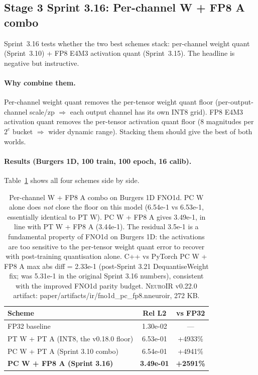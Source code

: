 \documentclass[10pt,twocolumn]{article}
\renewcommand{\texttt}[1]{{\normalfont\ttfamily #1}\normalfont\rmfamily}
\newcommand{\neuroir}{\textsc{NeuroIR}}
\begin{document}
\subsection{Stage 3 Sprint 3.16: Per-channel W + FP8 A combo}
\label{sec:pc-fp8-combo}

Sprint~3.16 tests whether the two best schemes
stack: per-channel weight quant (Sprint~3.10) +
FP8 E4M3 activation quant (Sprint~3.15).  The
headline is negative but instructive.

\paragraph{Why combine them.}
Per-channel weight quant removes the per-tensor
weight quant floor (per-output-channel scale/zp
$\Rightarrow$ each output channel has its own INT8
grid).  FP8 E4M3 activation quant removes the
per-tensor activation quant floor (8 magnitudes
per $2^e$ bucket $\Rightarrow$ wider dynamic range).
Stacking them should give the best of both
worlds.

\paragraph{Results (Burgers 1D, 100 train, 100 epoch, 16 calib).}
Table~\ref{tab:pc-fp8-combo} shows all four
schemes side by side.

\begin{table}[h]
\centering
\begin{tabular}{lcc}
\hline
\textbf{Scheme} & \textbf{Rel L2} & \textbf{vs FP32} \\
\hline
FP32 baseline & 1.30e-02 & --- \\
PT W + PT A (INT8, the v0.18.0 floor) & 6.53e-01 & +4933\% \\
PC W + PT A (Sprint 3.10 combo) & 6.54e-01 & +4941\% \\
\textbf{PC W + FP8 A (Sprint 3.16)} & \textbf{3.49e-01} & \textbf{+2591\%} \\
\hline
\end{tabular}
\caption{Per-channel W + FP8 A combo on Burgers 1D
FNO1d.  PC W alone does \emph{not} close the floor
on this model (6.54e-1 vs 6.53e-1, essentially
identical to PT W).  PC W + FP8 A gives 3.49e-1,
in line with PT W + FP8 A (3.44e-1).  The
residual 3.5e-1 is a fundamental property of
FNO1d on Burgers 1D: the activations are too
sensitive to the per-tensor weight quant error
to recover with post-training quantisation
alone.  C++ vs PyTorch PC W + FP8 A max abs
diff = 2.33e-1 (post-Sprint 3.21 DequantiseWeight
fix; was 5.31e-1 in the original Sprint 3.16
numbers), consistent with the improved
FNO1d parity budget.
\neuroir{} v0.22.0 artifact:
\texttt{paper/artifacts/ir/fno1d\_pc\_fp8.nneuroir},
272 KB.}
\label{tab:pc-fp8-combo}
\end{table}
\end{document}
